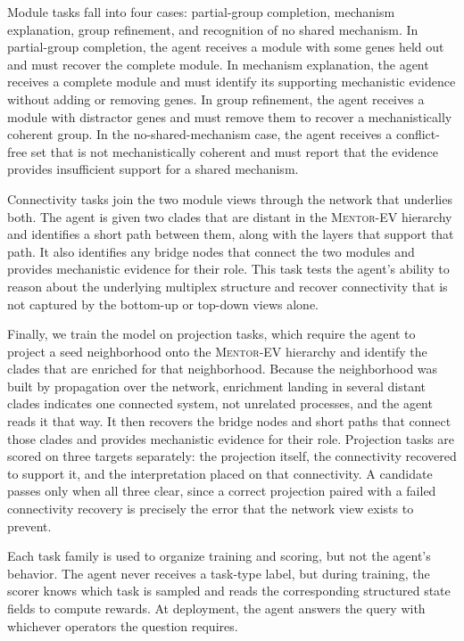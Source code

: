 \documentclass[thesis,letterpaper,12pt]{utthesis}
\begin{document}
Module tasks fall into four cases: partial-group completion, mechanism explanation, group refinement, and recognition of no shared mechanism. In partial-group completion, the agent receives a module with some genes held out and must recover the complete module. In mechanism explanation, the agent receives a complete module and must identify its supporting mechanistic evidence without adding or removing genes. In group refinement, the agent receives a module with distractor genes and must remove them to recover a mechanistically coherent group. In the no-shared-mechanism case, the agent receives a conflict-free set that is not mechanistically coherent and must report that the evidence provides insufficient support for a shared mechanism.

Connectivity tasks join the two module views through the network that underlies both. The agent is given two clades that are distant in the \textsc{Mentor-EV} hierarchy and identifies a short path between them, along with the layers that support that path. It also identifies any bridge nodes that connect the two modules and provides mechanistic evidence for their role. This task tests the agent's ability to reason about the underlying multiplex structure and recover connectivity that is not captured by the bottom-up or top-down views alone.

Finally, we train the model on projection tasks, which require the agent to project a seed neighborhood onto the \textsc{Mentor-EV} hierarchy and identify the clades that are enriched for that neighborhood. Because the neighborhood was built by propagation over the network, enrichment landing in several distant clades indicates one connected system, not unrelated processes, and the agent reads it that way. It then recovers the bridge nodes and short paths that connect those clades and provides mechanistic evidence for their role. Projection tasks are scored on three targets separately: the projection itself, the connectivity recovered to support it, and the interpretation placed on that connectivity. A candidate passes only when all three clear, since a correct projection paired with a failed connectivity recovery is precisely the error that the network view exists to prevent.

Each task family is used to organize training and scoring, but not the agent's behavior. The agent never receives a task-type label, but during training, the scorer knows which task is sampled and reads the corresponding structured state fields to compute rewards. At deployment, the agent answers the query with whichever operators the question requires.
\end{document}
